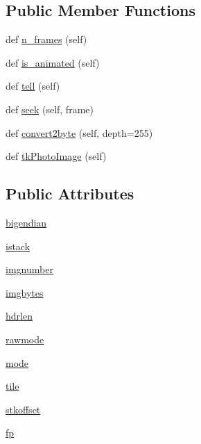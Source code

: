 \subsection*{Public Member Functions}
\begin{DoxyCompactItemize}
\item 
def \hyperlink{classPIL_1_1SpiderImagePlugin_1_1SpiderImageFile_a03eee80e162fd4329b4079d813f5715a}{n\+\_\+frames} (self)
\item 
def \hyperlink{classPIL_1_1SpiderImagePlugin_1_1SpiderImageFile_a98bc59f89c641cbe0b6d101128954e6e}{is\+\_\+animated} (self)
\item 
def \hyperlink{classPIL_1_1SpiderImagePlugin_1_1SpiderImageFile_ae5cf33a08c8f480571f2cde0364089ae}{tell} (self)
\item 
def \hyperlink{classPIL_1_1SpiderImagePlugin_1_1SpiderImageFile_afc3e26f92829ecdfceb6576086ddcaae}{seek} (self, frame)
\item 
def \hyperlink{classPIL_1_1SpiderImagePlugin_1_1SpiderImageFile_ad14fe099c275cec444b6c1c9799d6238}{convert2byte} (self, depth=255)
\item 
def \hyperlink{classPIL_1_1SpiderImagePlugin_1_1SpiderImageFile_a0368aee8ec2f10f3071654eada4f32ec}{tk\+Photo\+Image} (self)
\end{DoxyCompactItemize}
\subsection*{Public Attributes}
\begin{DoxyCompactItemize}
\item 
\hyperlink{classPIL_1_1SpiderImagePlugin_1_1SpiderImageFile_abf435640f9e6733253d2044f3d7c7a72}{bigendian}
\item 
\hyperlink{classPIL_1_1SpiderImagePlugin_1_1SpiderImageFile_a02f8d3df59237f4bef7f6eaaffbb1efb}{istack}
\item 
\hyperlink{classPIL_1_1SpiderImagePlugin_1_1SpiderImageFile_a4fb48418e80cee475bd198a6e10102fb}{imgnumber}
\item 
\hyperlink{classPIL_1_1SpiderImagePlugin_1_1SpiderImageFile_a25009e70e4a193d4092717a142c77901}{imgbytes}
\item 
\hyperlink{classPIL_1_1SpiderImagePlugin_1_1SpiderImageFile_a24acb28681a0340a722d9cd6ca8689bd}{hdrlen}
\item 
\hyperlink{classPIL_1_1SpiderImagePlugin_1_1SpiderImageFile_a9a59baea87b205bb15688100ee305591}{rawmode}
\item 
\hyperlink{classPIL_1_1SpiderImagePlugin_1_1SpiderImageFile_af7a2bc036a90667b4f930fe155711a24}{mode}
\item 
\hyperlink{classPIL_1_1SpiderImagePlugin_1_1SpiderImageFile_ac82184905f329091fc057ba9408574ca}{tile}
\item 
\hyperlink{classPIL_1_1SpiderImagePlugin_1_1SpiderImageFile_ae96be58639c1d83f4dc1d19f2c6a8e94}{stkoffset}
\item 
\hyperlink{classPIL_1_1SpiderImagePlugin_1_1SpiderImageFile_a759cd32949ac60d6b6ff0beb69557aad}{fp}
\end{DoxyCompactItemize}

